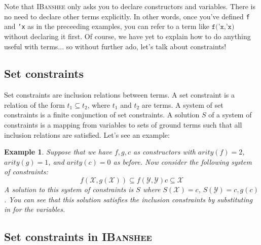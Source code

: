 \documentclass{article}
\newcommand{\ibanshee}{\textsc{IBanshee}}
\newcommand{\var}[1]{\mathcal{#1}}
\newtheorem{example}{Example}
\begin{document}
Note that \ibanshee{} only asks you to declare constructors and
variables. There is no need to declare other terms explicitly. In
other words, once you've defined \texttt{f} and \texttt{'x} as in the
preceeding examples, you can refer to a term like $\texttt{f('x,'x)}$
without declaring it first. Of course, we have yet to explain how to
do anything useful with terms... so without further ado, let's talk
about constraints!

\subsection{Set constraints}

Set constraints are inclusion relations between terms. A set
constraint is a relation of the form $t_1 \subseteq t_2$, where $t_1$
and $t_2$ are terms. A system of set constraints is a finite
conjunction of set constraints. A solution $S$ of a system of
constraints is a mapping from variables to sets of ground terms such
that all inclusion relations are satisfied. Let's see an example:

\begin{example}
Suppose that we have $f,g,c$ as constructors with $arity(f) = 2$,
$arity(g) = 1$, and $arity(c) = 0$ as before. Now consider the
following system of constraints:
\[
f(\var{X},g(\var{X})) \subseteq f(\var{Y},\var{Y})
c \subseteq \var{X}
\]
A solution to this system of constraints is $S$ where $S(\var{X}) =
{c}$, $S(\var{Y}) = {c,g(c)}$. You can see that this solution
satisfies the inclusion constraints by substituting in for the
variables.
\end{example}

\subsection{Set constraints in \ibanshee{}}
\end{document}
